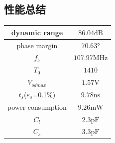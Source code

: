 \documentclass[a4paper]{article}
\newcommand{\uV}{\si{\volt}}
\newcommand{\upF}{\si{\pico\farad}}
\newcommand{\uns}{\si{\nano\second}}
\newcommand{\umW}{\si{\milli\watt}}
\newcommand{\uMHz}{\si{\mega\hertz}}
\newcommand{\udB}{\si{\deci\bel}}
\newcommand{\udeg}{\si{\degree}}
\begin{document}
\subsection{性能总结}
\begin{table}[htbp]
    \begin{tabular}{|c|c|}
        \hline
        dynamic range&$86.04\udB$
        \\\hline
        phase margin&$70.63\udeg$
        \\\hline
        $f_c$ &$107.97\uMHz$
        \\\hline 
        $T_0$&$1410$
        \\\hline
        $V_{odmax}$&$1.57\uV$
        \\\hline
        $t_s$($\varepsilon_s$=0.1\%)&$9.78\uns$
        \\\hline
        power consumption&$9.26\umW$
        \\\hline
        $C_l$&$2.3\upF$
        \\\hline
        $C_s$&$3.3\upF$
        \\\hline
    \end{tabular}
\end{table}






\end{document}
